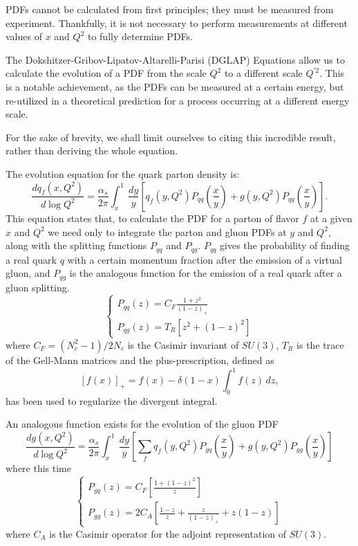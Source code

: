 \documentclass[10pt,a4paper]{book}
\begin{document}
PDFs cannot be calculated from first principles; they must be measured from experiment. Thankfully, it is not necessary to perform measurements at different values of $x$ and $Q^2$ to fully determine PDFs.

The Dokshitzer-Gribov-Lipatov-Altarelli-Parisi (DGLAP) Equations \cite{GRIBOV197178, Altarelli:1977zs} allow us to calculate the evolution of a PDF from the scale $Q^2$ to a different scale $Q^{\prime 2}$. This is a notable achievement, as the PDFs can be measured at a certain energy, but re-utilized in a theoretical prediction for a process occurring at a different energy scale. 

For the sake of brevity, we shall limit ourselves to citing this incredible result, rather than deriving the whole equation.

The evolution equation for the quark parton density is:
\begin{equation}
\frac{dq_f(x,Q^2)}{d\log Q^2} = \frac{\alpha_s}{2\pi}\int_x^1 \, \frac{dy}{y} \left[q_f(y,Q^2)P_{qq}\left(\frac{x}{y} \right) + g(y,Q^2)P_{qg}\left(\frac{x}{y} \right) \right].
\end{equation}
This equation states that, to calculate the PDF for a parton of flavor $f$ at a given $x$ and $Q^2$ we need only to integrate the parton and gluon PDFs at $y$ and $Q^2$, along with the splitting functions $P_{qq}$ and $P_{qg}$. $P_{qq}$ gives the probability of finding a real quark $q$ with a certain momentum fraction after the emission of a virtual gluon, and $P_{qg}$ is the analogous function for the emission of a real quark after a gluon splitting.
\begin{equation}
\begin{cases}
P_{qq}(z) = C_F\frac{1 + z^2}{(1 - z)_+} \\
P_{qg}(z) = T_R\left[z^2 + (1-z)^2 \right]
\end{cases}
\end{equation}
where $C_F = (N_c^2 - 1)/2N_c$ is the Casimir invariant of $SU(3)$, $T_R$ is the trace of the Gell-Mann matrices and the plus-prescription, defined as
\begin{equation}
\left[f(x) \right]_+ = f(x) - \delta (1-x)\int_0^1 f(z) \, dz,
\end{equation}
has been used to regularize the divergent integral. 

An analogous function exists for the evolution of the gluon PDF
\begin{equation}
\frac{dg(x,Q^2)}{d\log Q^2} = \frac{\alpha_s}{2\pi}\int_x^1 \, \frac{dy}{y} \left[\sum_f q_f(y,Q^2)P_{gq}\left(\frac{x}{y} \right) + g(y,Q^2)P_{gg}\left(\frac{x}{y} \right) \right]
\end{equation}
where this time
\begin{equation}
\begin{cases}
P_{gq}(z) = C_F\left[ \frac{1 + (1-z)^2}{z}\right] \\
P_{gg}(z) = 2C_A\left[\frac{1 - z}{z} + \frac{z}{(1 - z)_+} + z(1-z) \right]
\end{cases}
\end{equation}
where $C_A$ is the Casimir operator for the adjoint representation of $SU(3)$.
 
\end{document}
